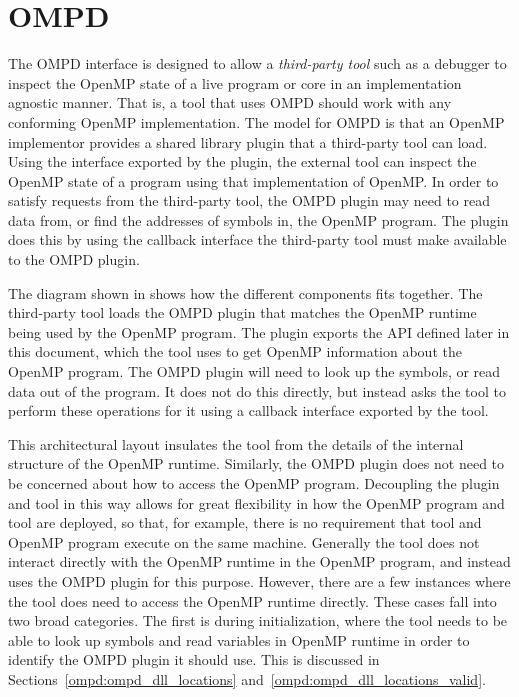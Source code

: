 \section{OMPD}
\label{ompd:ompd-overview}

The OMPD interface is designed to allow a \emph{third-party tool}
such as a debugger to inspect the OpenMP state of a live program
or core in an implementation agnostic manner.
That is, a tool that uses OMPD should work with any conforming
OpenMP implementation.
The model for OMPD is that an OpenMP implementor provides a shared
library plugin that a third-party tool can load.
Using the interface exported by the plugin, the external tool can
inspect the OpenMP state of a program using that implementation of OpenMP.
In order to satisfy requests from the third-party tool, the OMPD plugin
may need to read data from, or find the addresses of symbols in,
the OpenMP program.
The plugin does this by using the callback interface the third-party
tool must make available to the OMPD plugin.

%    


The diagram shown in   shows how the different
components fits together.
The third-party tool loads the OMPD plugin that matches the OpenMP runtime
being used by the OpenMP program.
The plugin exports the API defined later in this document,
which the tool uses to get OpenMP information about the OpenMP program.
The OMPD plugin will need to look up the symbols,
or read data out of the program.
It does not do this directly, but instead asks the tool to perform
these operations for it using a callback interface exported by the tool.

This architectural layout insulates the tool from the details
of the internal structure of the OpenMP runtime.
Similarly, the OMPD plugin does not need to be concerned about
how to access the OpenMP program.
Decoupling the plugin and tool in this way allows for
great flexibility in how the OpenMP program and tool are deployed,
so that, for example, there is no requirement that tool
and OpenMP program execute on the same machine.
Generally the tool does not interact directly with the OpenMP
runtime in the OpenMP program, and instead uses the OMPD plugin
for this purpose.
However, there are a few instances where the tool does need
to access the OpenMP runtime directly.
These cases fall into two broad categories.
The first is during initialization, where the tool needs
to be able to look up symbols and read variables in OpenMP runtime
in order to identify the OMPD plugin it should use.
This is discussed in Sections~\ref{ompd:ompd_dll_locations}
and~\ref{ompd:ompd_dll_locations_valid}.


